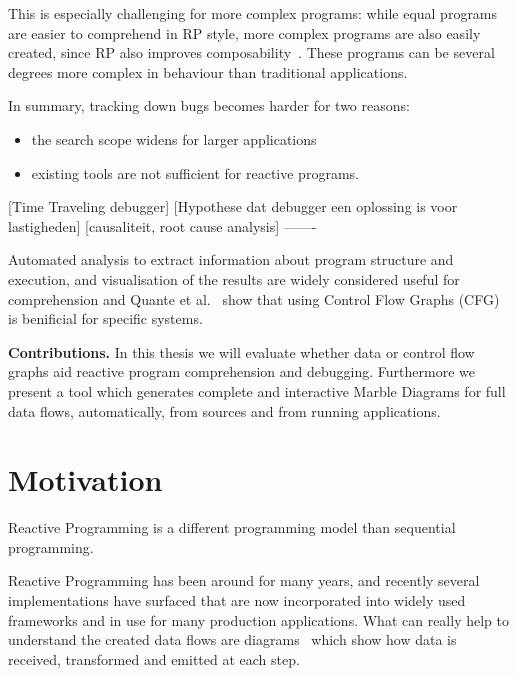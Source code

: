 This is especially challenging for more complex programs:  while equal
programs are easier to comprehend in RP style, more complex programs are
also easily created, since RP also improves composability~\cite{maier2012deprecating}.
These programs can be several degrees more complex in behaviour than
traditional applications.

In summary, tracking down bugs becomes harder for two reasons:

\begin{itemize}
    \item
        the search scope widens for larger applications
    \item
        existing tools are not sufficient for reactive programs.

\end{itemize}

[Time Traveling debugger] [Hypothese dat debugger een oplossing is voor
lastigheden] [causaliteit, root cause analysis] -------

Automated analysis to extract information about program structure and
execution, and visualisation of the results are widely considered useful
for comprehension and Quante et al.~\cite{quante2008dynamic} show that
using Control Flow Graphs (CFG) is benificial for specific systems.

\textbf{Contributions.} In this thesis we will evaluate whether data or
control flow graphs aid reactive program comprehension and debugging.
Furthermore we present a tool which generates complete and interactive
Marble Diagrams for full data flows, automatically, from sources and
from running applications.

\section{Motivation}%
\label{sec:motiv} Reactive Programming is a different programming model
than sequential programming.


Reactive Programming has been around for many years, and recently
several implementations have surfaced that are now incorporated into
widely used frameworks and in use for many production applications.
What can really help to understand the created data flows are diagrams~\cite
{weck2016visualizing} which show how data is received, transformed and
emitted at each step.

